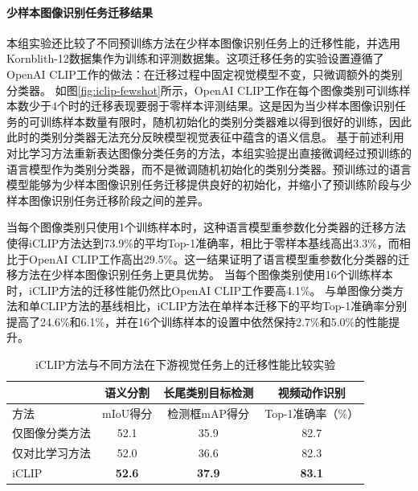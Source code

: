 \paragraph{少样本图像识别任务迁移结果} 本组实验还比较了不同预训练方法在少样本图像识别任务上的迁移性能，并选用Kornblith-12数据集作为训练和评测数据集。这项迁移任务的实验设置遵循了OpenAI CLIP工作的做法：在迁移过程中固定视觉模型不变，只微调额外的类别分类器。
如图\ref{fig:iclip-fewshot}所示，OpenAI CLIP工作在每个图像类别可训练样本数少于4个时的迁移表现要弱于零样本评测结果。这是因为当少样本图像识别任务的可训练样本数量有限时，随机初始化的类别分类器难以得到很好的训练，因此此时的类别分类器无法充分反映模型视觉表征中蕴含的语义信息。
基于前述利用对比学习方法重新表达图像分类任务的方法，本组实验提出直接微调经过预训练的语言模型作为类别分类器，而不是微调随机初始化的类别分类器。预训练过的语言模型能够为少样本图像识别任务迁移提供良好的初始化，并缩小了预训练阶段与少样本图像识别任务迁移阶段之间的差异。

当每个图像类别只使用1个训练样本时，这种语言模型重参数化分类器的迁移方法使得iCLIP方法达到73.9\%的平均Top-1准确率，相比于零样本基线高出3.3\%，而相比于OpenAI CLIP工作高出29.5\%。这一结果证明了语言模型重参数化分类器的迁移方法在少样本图像识别任务上更具优势。
当每个图像类别使用16个训练样本时，iCLIP方法的迁移性能仍然比OpenAI CLIP工作要高4.1\%。
与单图像分类方法和单CLIP方法的基线相比，iCLIP方法在单样本迁移下的平均Top-1准确率分别提高了24.6\%和6.1\%，并在16个训练样本的设置中依然保持2.7\%和5.0\%的性能提升。

\begin{table}
  \centering
    \caption{iCLIP方法与不同方法在下游视觉任务上的迁移性能比较实验}
  \begin{tabular}{lccc}
    \toprule
    \multicolumn{1}{c}{} & \multicolumn{1}{c}{语义分割} & \multicolumn{1}{c}{长尾类别目标检测} & \multicolumn{1}{c}{视频动作识别}\\
    \midrule
  方法 & mIoU得分 & 检测框mAP得分 & Top-1准确率（\%）\\
    \midrule
    仅图像分类方法 & 52.1 & 35.9 & 82.7 \\
    仅对比学习方法 & 52.0 & 36.6 & 82.3 \\
    iCLIP &\textbf{52.6} & \textbf{37.9} & \textbf{83.1} \\
    \bottomrule
  \end{tabular}

  \label{tab:iclip-overall-transfer}
\end{table}

